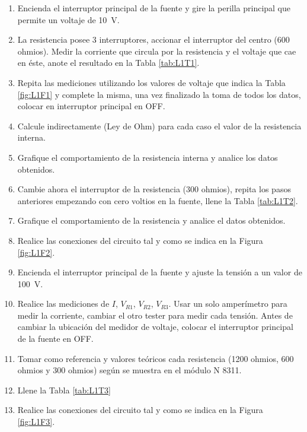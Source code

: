 \documentclass[12pt,letterpaper]{report}
\begin{document}
\begin{enumerate}
\item Encienda el interruptor principal de la fuente y gire la perilla principal que permite un voltaje de \SI{10}{\volt}. 
\item La resistencia posee 3 interruptores, accionar el interruptor del centro (600 ohmios). Medir la corriente que circula por la  resistencia y el voltaje que cae en éste, anote el resultado en la Tabla \ref{tab:L1T1}.
\item	Repita las mediciones utilizando los valores de voltaje que indica la Tabla \ref{fig:L1F1} y complete la misma, una vez finalizado la toma de todos los datos, colocar en interruptor principal en OFF. 
\item Calcule indirectamente (Ley de Ohm) para cada caso el valor de la resistencia interna.
\item	Grafique el comportamiento de la resistencia interna y analice los datos obtenidos. 
\item	Cambie ahora el interruptor de la resistencia (300 ohmios), repita los pasos anteriores empezando con cero voltios en la fuente, llene la Tabla \ref{tab:L1T2}.
\item  Grafique el comportamiento de la resistencia y analice el datos obtenidos. 
\item Realice las conexiones del circuito tal y como se indica en la Figura \ref{fig:L1F2}.
\item Encienda el interruptor principal de la fuente y ajuste la tensión a un valor de \SI{100}{\volt}.
\item Realice las mediciones de $I$, $V_{R1}$, $V_{R2}$, $V_{R3}$. Usar un solo amperímetro para medir la corriente, cambiar el otro tester para medir cada tensión. Antes de cambiar la ubicación del medidor de voltaje, colocar el interruptor principal de la fuente en OFF.
\item Tomar como referencia y valores teóricos cada resistencia (1200 ohmios, 600 ohmios y 300 ohmios) según se muestra en el módulo N 8311.
\item Llene la Tabla \ref{tab:L1T3}
\item Realice las conexiones del circuito tal y como se indica en la Figura \ref{fig:L1F3}.


\end{enumerate}
\end{document}
